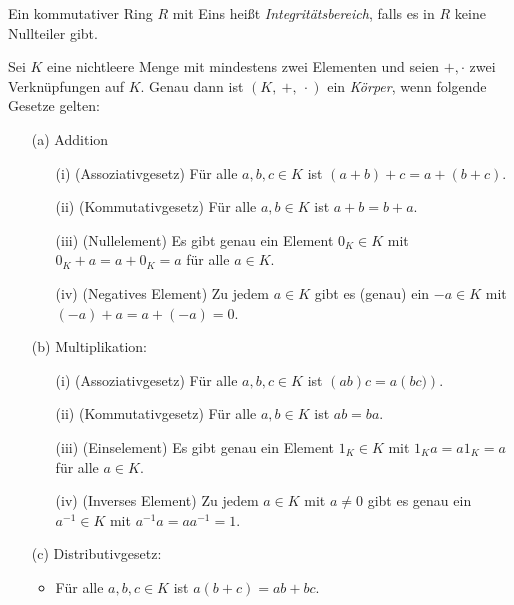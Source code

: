 \begin{defn} \label{Integritätsbereich}
Ein kommutativer Ring $R$ mit Eins heißt \textit{Integritätsbereich}, falls es in $R$ keine Nullteiler gibt.
\end{defn}
%
%
%
%
%
%
% 
%
%
% 
\begin{defn}
Sei $K$ eine nichtleere Menge mit mindestens zwei Elementen und seien $+, \cdot$ zwei Verknüpfungen auf $K$. Genau dann ist $\left(K, ~+,~ \cdot\right)$ ein \textit{Körper}, wenn folgende Gesetze gelten:
\begin{enumerate}
\item[(a)] Addition
\begin{enumerate}
\item[(i)] (Assoziativgesetz) Für alle $a, b, c \in K$ ist $\left(a + b \right) + c = a + \left(b +c\right)$.
\item[(ii)] (Kommutativgesetz) Für alle $a, b \in K$ ist $a+b = b + a$.
\item[(iii)] (Nullelement) Es gibt genau ein Element $0_K \in K$ mit $0_K + a = a + 0_K = a$ für alle $a \in K$.
\item[(iv)] (Negatives Element) Zu jedem $a \in K$ gibt es (genau) ein $-a \in K$ mit $\left(-a\right)+ a = a + \left(-a\right)= 0$.
\end{enumerate} 
\item[(b)] Multiplikation:
\begin{enumerate}
\item[(i)] (Assoziativgesetz) Für alle $a, b, c \in K$ ist $\left(ab\right)c = a\left(bc)\right)$.
\item[(ii)] (Kommutativgesetz) Für alle $a, b \in K$ ist $ab = ba$.
\item[(iii)] (Einselement) Es gibt genau ein Element $1_K \in K$ mit $1_K a = a 1_K = a$ für alle $a \in K$.
\item[(iv)] (Inverses Element) Zu jedem $a \in K$ mit $a\neq 0 $ gibt es genau ein $a^{-1} \in K$ mit $a^{-1} a = a a^{-1} = 1$.
\end{enumerate}
\item[(c)] Distributivgesetz:
\begin{itemize}
\item Für alle $a, b, c \in K$ ist $a\left(b +c\right) = ab + bc$.
\end{itemize}
\end{enumerate}
\end{defn}



